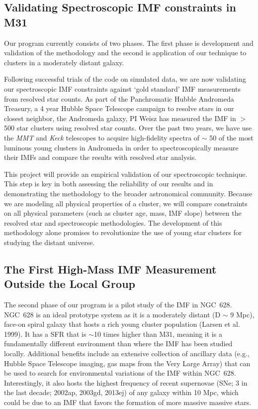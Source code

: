 \documentclass[11pt,preprint]{aastex}
\begin{document}
\subsection{Validating Spectroscopic IMF constraints in M31}

Our program currently consists of two phases.  The first phase is development and validation of the methodology and the second is application of our technique to clusters in a moderately distant galaxy.

Following successful trials of the code on simulated data, we are now validating our spectroscopic IMF constraints against `gold standard' IMF measurements from resolved star counts.  As part of the Panchromatic Hubble Andromeda Treasury, a 4 year Hubble Space Telescope campaign to resolve stars in our closest neighbor, the Andromeda galaxy, PI Weisz has measured the IMF in $>$500 star clusters using resolved star counts.  Over the past two years, we have use the \textit{MMT} and \textit{Keck} telescopes to acquire high-fidelity spectra of $\sim$ 50 of the most luminous young clusters in Andromeda in order to spectroscopically measure their IMFs and compare the results with resolved star analysis.  

This project will provide an empirical validation of our spectroscopic technique.  This step is key in both assessing the reliability of our results and in demonstrating the methodology to the broader astronomical community.  Because we are modeling all physical properties of a cluster, we will compare constraints on all physical parameters (such as cluster age, mass, IMF slope) between the resolved star and spectroscopic  methodologies.  The development of this methodology alone promises to revolutionize the use of young star clusters for studying the distant universe.

\subsection{The First High-Mass IMF Measurement Outside the Local Group}

The second phase of our program is a pilot study of the IMF in NGC~628.  NGC~628 is an ideal prototype system as it is a moderately distant (D $\sim$ 9 Mpc), face-on spiral galaxy that hosts a rich young cluster population (Larsen et al. 1999).  It has a SFR that is $\sim$10 times higher than M31, meaning it is a fundamentally different environment than where the IMF has been studied locally.  Additional benefits include an extensive collection of ancillary data (e.g., Hubble Space Telescope imaging, gas maps from the Very Large Array) that can be used to search for environmental variations of the IMF within NGC~628. Interestingly, it also hosts the highest frequency of recent supernovae (SNe; 3 in the last decade;  2002ap, 2003gd, 2013ej) of any galaxy within 10 Mpc, which could be due to an IMF that favors the formation of more massive massive stars. 
\end{document}
